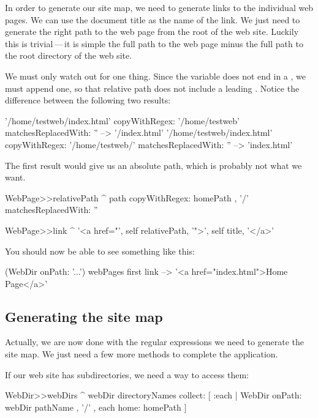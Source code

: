 \documentclass[a4paper,10pt,twoside]{book}
\begin{document}
In order to generate our site map, we need to generate links to the individual web pages.
We can use the document title as the name of the link.  We just need to generate the right path to the web page from the root of the web site.
Luckily this is trivial\,---\,it is simple the full path to the web page minus the full path to the root directory of the web site.

We must only watch out for one thing.  Since the  variable does not end in a \ct{/}, we must append one, so that relative path does not include a leading \ct{/}. Notice the difference between the following two results:

\begin{code}{}
'/home/testweb/index.html' copyWithRegex: '/home/testweb' matchesReplacedWith: '' --> '/index.html'
'/home/testweb/index.html' copyWithRegex: '/home/testweb/' matchesReplacedWith: '' -->  'index.html'
\end{code}

The first result would give us an absolute path, which is probably not what we want.


\begin{code}{}
WebPage>>relativePath
	^ path 
		copyWithRegex: homePath , '/'
		matchesReplacedWith: ''

WebPage>>link
	^ '<a href="', self relativePath, '">', self title, '</a>'
\end{code}

You should now be able to see something like this:

\begin{code}{}
(WebDir onPath: '...') webPages first link --> '<a href="index.html">Home Page</a>'
\end{code}

\subsection{Generating the site map}

Actually, we are now done with the regular expressions we need to generate the site map.  We just need a few more methods to complete the application.


If our web site has subdirectories, we need a way to access them:
\begin{code}{}
WebDir>>webDirs
	^ webDir directoryNames
		collect: [ :each | WebDir onPath: webDir pathName , '/' , each home: homePath ]
\end{code}
\end{document}
